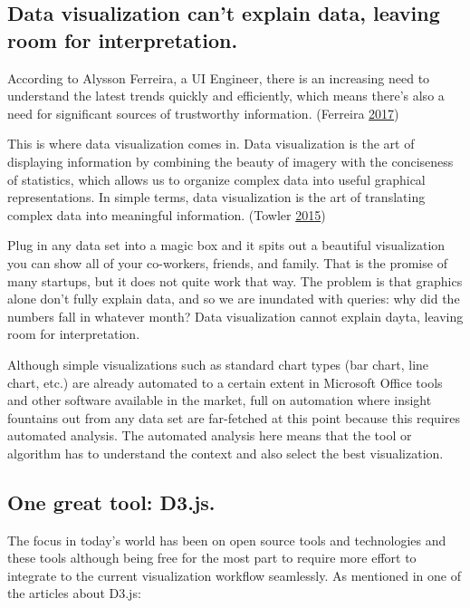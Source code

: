 \documentclass[]{book}
\begin{document}
\hypertarget{data-visualization-cant-explain-data-leaving-room-for-interpretation.}{%
\subsection{Data visualization can't explain data, leaving room for interpretation.}\label{data-visualization-cant-explain-data-leaving-room-for-interpretation.}}

According to Alysson Ferreira, a UI Engineer, there is an increasing need to understand the latest trends quickly and efficiently, which means there's also a need for significant sources of trustworthy information. (Ferreira \protect\hyperlink{ref-UI_engineer}{2017})

This is where data visualization comes in. Data visualization is the art of displaying information by combining the beauty of imagery with the conciseness of statistics, which allows us to organize complex data into useful graphical representations. In simple terms, data visualization is the art of translating complex data into meaningful information. (Towler \protect\hyperlink{ref-future_viz}{2015})

Plug in any data set into a magic box and it spits out a beautiful visualization you can show all of your co-workers, friends, and family. That is the promise of many startups, but it does not quite work that way. The problem is that graphics alone don't fully explain data, and so we are inundated with queries: why did the numbers fall in whatever month? Data visualization cannot explain dayta, leaving room for interpretation.

Although simple visualizations such as standard chart types (bar chart, line chart, etc.) are already automated to a certain extent in Microsoft Office tools and other software available in the market, full on automation where insight fountains out from any data set are far-fetched at this point because this requires automated analysis. The automated analysis here means that the tool or algorithm has to understand the context and also select the best visualization.

\hypertarget{one-great-tool-d3.js.}{%
\subsection{One great tool: D3.js.}\label{one-great-tool-d3.js.}}

The focus in today's world has been on open source tools and technologies and these tools although being free for the most part to require more effort to integrate to the current visualization workflow seamlessly. As mentioned in one of the articles about D3.js:
\end{document}

